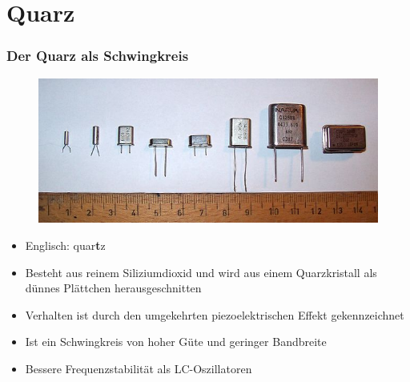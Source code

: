 \section*{Quarz}
\begin{frame}
  \frametitle{Der Quarz als Schwingkreis}
  \begin{center}
    \begin{figure}
      \includegraphics[width=\textwidth,height=.35\textheight,keepaspectratio]{a04/Quartz.jpg}
    \end{figure}
  \end{center}
  \begin{itemize}
    \item Englisch: quar\textbf{t}z
    \item Besteht aus reinem Siliziumdioxid und wird aus einem Quarzkristall als dünnes Plättchen herausgeschnitten
    \item Verhalten ist durch den umgekehrten piezoelektrischen Effekt gekennzeichnet
    \item Ist ein Schwingkreis von hoher Güte und geringer Bandbreite
    \item Bessere Frequenzstabilität als LC-Oszillatoren
  \end{itemize}
\end{frame}

